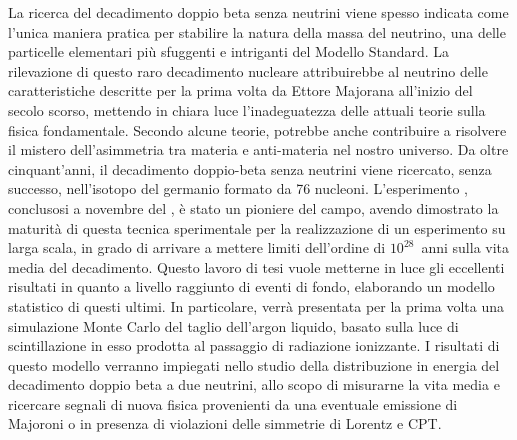 
La ricerca del decadimento doppio beta senza neutrini viene spesso indicata come l'unica
maniera pratica per stabilire la natura della massa del neutrino, una delle particelle
elementari più sfuggenti e intriganti del Modello Standard. La rilevazione di questo raro
decadimento nucleare attribuirebbe al neutrino delle caratteristiche descritte per la
prima volta da Ettore Majorana all'inizio del secolo scorso, mettendo in chiara luce
l'inadeguatezza delle attuali teorie sulla fisica fondamentale. Secondo alcune teorie,
potrebbe anche contribuire a risolvere il mistero dell'asimmetria tra materia e
anti-materia nel nostro universo. Da oltre cinquant'anni, il decadimento doppio-beta senza
neutrini viene ricercato, senza successo, nell'isotopo del germanio formato da 76
nucleoni. L'esperimento \gerda, conclusosi a novembre del , è stato un pioniere
del campo, avendo dimostrato la maturità di questa tecnica sperimentale per la
realizzazione di un esperimento su larga scala, in grado di arrivare a mettere limiti
dell'ordine di $10^{28}$~anni sulla vita media del decadimento. Questo lavoro di tesi
vuole metterne in luce gli eccellenti risultati in quanto a livello raggiunto di eventi di
fondo, elaborando un modello statistico di questi ultimi. In particolare, verrà presentata
per la prima volta una simulazione Monte Carlo del taglio dell'argon liquido, basato sulla
luce di scintillazione in esso prodotta al passaggio di radiazione ionizzante. I risultati
di questo modello verranno impiegati nello studio della distribuzione in energia del
decadimento doppio beta a due neutrini, allo scopo di misurarne la vita media e ricercare
segnali di nuova fisica provenienti da una eventuale emissione di Majoroni o in presenza
di violazioni delle simmetrie di Lorentz e CPT. 

